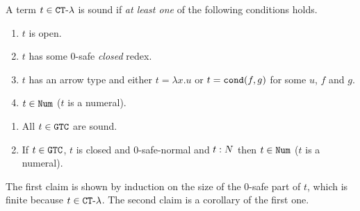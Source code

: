 \begin{definition}
A term $t \in { {\tt CT}\mbox{-}\lambda}$ is sound if \emph{at least one} of the following conditions holds.
\begin{enumerate}
\item
$t$ is open. 
\item
$t$ has some $0$-safe \emph{closed} redex. 
\item
$t$ has an arrow type and either $t=\lambda x.u$ or 
$t = {\tt cond}(f,g)$ for some $u$, $f$ and $g$. %
\item
$t \in {\tt Num}$ ($t$ is a numeral). 
\end{enumerate}
\end{definition}

\begin{proposition}
\label{proposition-closed-safe-normal-term-N}
\begin{enumerate}
\item
All $t \in {\tt GTC}$ are sound.
\item
If $t \in {\tt GTC}$, $t$ is closed and $0$-safe-normal and $t:{N}$ then $t \in {\tt Num}$ 
($t$ is a numeral).
\end{enumerate}
\end{proposition}

The first claim is shown by induction on the size of the $0$-safe part of $t$, 
which is finite because $t \in { {\tt CT}\mbox{-}\lambda}$. The second claim is a corollary of the first one.

